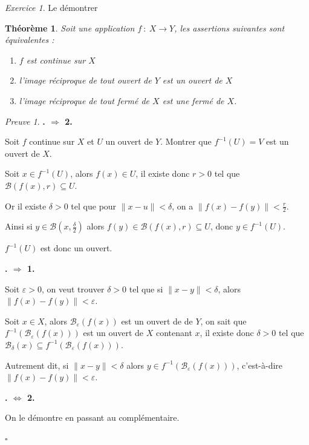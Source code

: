 \documentclass[]{article}
\newtheorem{mythm}{Théorème}
\theoremstyle{remark}
\newtheorem{myexer}{Exercice}
\newtheorem{myproof}{Preuve}
\theoremstyle{definition}
\newcommand{\cqfd}{
	\hfill$\square$
}
\newenvironment{proofpart}[1]{
	\noindent
	{\textbf{\boldmath #1}}
}{
	\checkmark
}
\begin{document}
\begin{myexer}
	Le démontrer
\end{myexer}

\begin{mythm}
	Soit une application $f~:~X \longrightarrow Y$, les assertions suivantes sont équivalentes :
	\begin{enumerate}
	 \item $f$ est continue sur $X$
	 \item l'image réciproque de tout ouvert de $Y$ est un ouvert de $X$
	 \item l'image réciproque de tout fermé de $X$ est une fermé de $X$.
 	\end{enumerate}
\end{mythm}

\begin{myproof}
	\begin{proofpart}{1. $\Longrightarrow$ 2.}
		Soit $f$ continue sur $X$ et $U$ un ouvert de $Y$. Montrer que $f^{-1}(U)=V$ est un ouvert de $X$.
		
		Soit $x \in f^{-1}(U)$, alors $f(x) \in U$, il existe donc $r>0$ tel que $\mathcal{B}(f(x), r) \subseteq U$.
		
		Or il existe $\delta > 0$ tel que pour $\|x-u\| < \delta$, on a $\|f(x)-f(y)\| < \frac{r}{2}$.
		
		Ainsi si $y \in \mathcal{B}\left(x, \frac{\delta}{2}\right)$ alors $f(y) \in \mathcal{B}(f(x), r) \subseteq U$, donc $y \in f^{-1}(U)$.
		
		$f^{-1}(U)$ est donc un ouvert.
	\end{proofpart}
	
	\begin{proofpart}{2. $\Longrightarrow$ 1.}
		Soit $\varepsilon > 0$, on veut trouver $\delta > 0$ tel que si $\|x-y\| < \delta$, alors $\|f(x)-f(y)\| < \varepsilon$.
	
		Soit $x \in X$, alors $\mathcal{B}_\varepsilon(f(x))$ est un ouvert de de $Y$, on sait que $f^{-1}(\mathcal{B}_\varepsilon(f(x)))$ est un ouvert de $X$ contenant $x$, il existe donc $\delta > 0$ tel que $\mathcal{B}_\delta(x) \subseteq f^{-1}(\mathcal{B}_\varepsilon(f(x)))$.
		
		Autrement dit, si $\|x-y\| < \delta$ alors $y \in f^{-1}(\mathcal{B}_\varepsilon(f(x)))$, c'est-à-dire $\|f(x)-f(y)\| < \varepsilon$.
	\end{proofpart}
	
	\begin{proofpart}{1. $\Longleftrightarrow$ 2.}
		On le démontre en passant au complémentaire.
	\end{proofpart}
	
	\cqfd
\end{myproof}
\end{document}
